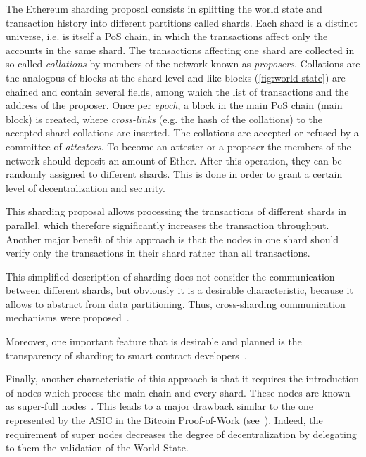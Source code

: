 The Ethereum sharding proposal consists in splitting the world state and
transaction history into different partitions called shards. Each shard is a
distinct universe, i.e. is itself a PoS chain, in which the transactions affect
only the accounts in the same shard. The transactions affecting one shard are
collected in so-called \emph{collations} by members of the network known as
\emph{proposers}. Collations are the analogous of blocks at the shard level and
like blocks (\autoref{fig:world-state}) are chained and contain several fields,
among which the list of transactions and the address of the proposer. Once per
\emph{epoch}, a block in the main PoS chain (main block) is created, where
\emph{cross-links} (e.g. the hash of the collations) to the accepted shard
collations are inserted. The collations are accepted or refused by a committee
of \emph{attesters}. To become an attester or a proposer the members of the
network should deposit an amount of Ether. After this operation, they can be
randomly assigned to different shards. This is done in order to grant a certain
level of decentralization and security.


This sharding proposal allows processing the transactions of different shards in
parallel, which therefore significantly increases the transaction throughput.
Another major benefit of this approach is that the nodes in one shard should
verify only the transactions in their shard rather than all
transactions.

This simplified description of sharding does not consider the communication
between different shards, but obviously it is a desirable characteristic,
because it allows to abstract from data partitioning.
Thus, cross-sharding communication mechanisms were
proposed~\cite{bib:sharding-faq}.

Moreover, one important feature that is desirable and planned is the
transparency of sharding to smart contract developers~\cite{bib:sharding-faq}.

Finally, another characteristic of this approach is that it requires the
introduction of nodes which process the main chain and every shard. These nodes
are known as super-full nodes~\cite{bib:sharding-faq}. This leads to a major
drawback similar to the one represented by the ASIC in the Bitcoin Proof-of-Work
(see~\cite{sec:pow}). Indeed, the requirement of super nodes decreases the
degree of decentralization by delegating to them the validation of the World State.

